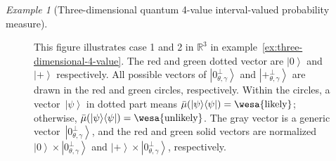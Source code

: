 \documentclass{article}
\theoremstyle{remark}
\newtheorem{example}{Example}
\newcommand{\likely}{{\mbox{\wesa{likely}}}}
\newcommand{\unlikely}{{\mbox{\wesa{unlikely}}}}
\newcommand{\ket}[1]{{\left\vert{#1}\right\rangle}}
\newcommand{\op}[2]{\ensuremath{\left\vert{#1}\middle\rangle\middle\langle{#2}\right\vert}}
\newcommand{\proj}[1]{\op{#1}{#1}}
\newcommand{\ps}{\texttt{+}}
\begin{document}
\begin{example}[Three-dimensional quantum 4-value interval-valued
probability measure]
\begin{center}
\begin{figure}
\caption{\label{fig:three-dimensional-4-value}This figure illustrates case
1 and 2 in $\mathbb{R}^{3}$ in example~\ref{ex:three-dimensional-4-value}.
The red and green dotted vector are $\ket{0}$ and $\ket{\ps}$ respectively.
All possible vectors of $\ket{0_{\theta,\gamma}^{\perp}}$ and $\ket{\ps_{\theta,\gamma}^{\perp}}$
are drawn in the red and green circles, respectively. Within the circles,
a vector~$\ket{\psi}$ in dotted part means $\bar{\mu}(\proj{\psi})=\likely$;
otherwise, $\bar{\mu}(\proj{\psi})=\unlikely$. The gray vector is
a generic vector~$\ket{0_{\theta,\gamma}^{\perp}}$, and the red
and green solid vectors are normalized $\ket{0}\times\ket{0_{\theta,\gamma}^{\perp}}$
and $\ket{\ps}\times\ket{0_{\theta,\gamma}^{\perp}}$, respectively.}
\end{figure}
\end{center}


\end{example}
\end{document}
